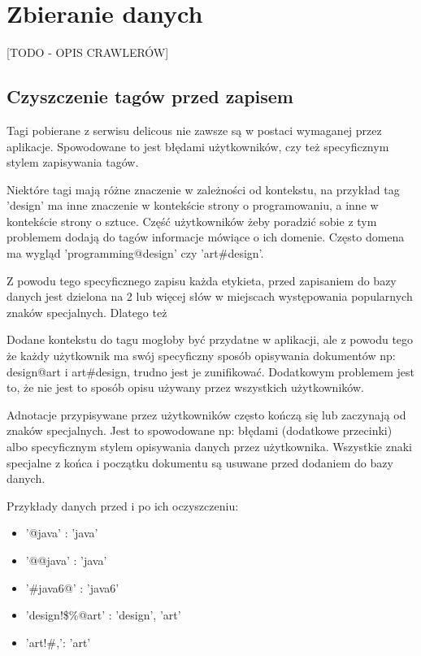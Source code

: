 \section{Zbieranie danych}

	[TODO - OPIS CRAWLERÓW]

\subsection{Czyszczenie tagów przed zapisem}

Tagi pobierane z serwisu delicous nie zawsze są w postaci wymaganej przez aplikacje. Spowodowane to jest błędami użytkowników, czy też specyficznym stylem zapisywania tagów.

Niektóre tagi mają różne znaczenie w zależności od kontekstu, na przykład tag 'design' ma inne znaczenie w kontekście strony o programowaniu, a inne w kontekście strony o sztuce. Część użytkowników żeby poradzić sobie  z tym problemem dodają do tagów informacje mówiące o ich domenie. Często domena ma wygląd 'programming@design' czy 'art\#design'. 

Z powodu tego specyficznego zapisu każda etykieta, przed zapisaniem do bazy danych jest dzielona na 2 lub więcej słów w miejscach występowania popularnych znaków specjalnych. Dlatego też 

Dodane kontekstu do tagu mogłoby być przydatne w aplikacji, ale z powodu tego że każdy użytkownik ma swój specyficzny sposób opisywania dokumentów np: design@art i art\#design, trudno jest je zunifikować. Dodatkowym problemem jest to, że nie jest to sposób opisu używany przez wszystkich użytkowników. 


Adnotacje przypisywane przez użytkowników często kończą się lub zaczynają od znaków specjalnych. Jest to spowodowane np: błędami (dodatkowe przecinki) albo specyficznym stylem opisywania danych przez użytkownika. Wszystkie znaki specjalne z końca i początku dokumentu są usuwane przed dodaniem do bazy danych.

Przykłady danych przed i po ich oczyszczeniu:

\begin{itemize} 
    \item '@java' : 'java'
    \item '@@java' : 'java'
    \item  '\#java6@' : 'java6'
    \item  'design!\$\%@art' : 'design', 'art'
    \item  'art!\#,': 'art'
\end{itemize}